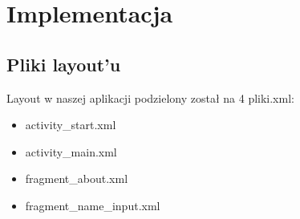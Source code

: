 	\newpage
\section{Implementacja}		%
\subsection{Pliki layout'u}
\hspace{0.60cm}Layout w naszej aplikacji podzielony został na 4 pliki.xml:
\begin{itemize}
	\item activity\_start.xml
	\item activity\_main.xml
	\item fragment\_about.xml
        \item fragment\_name\_input.xml
\end{itemize}

